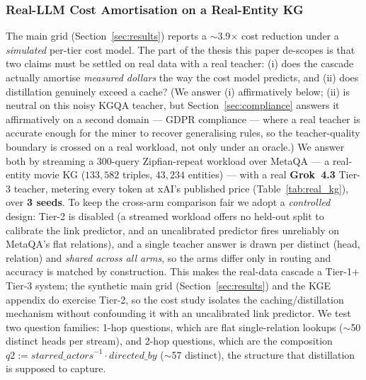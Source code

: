 \documentclass[11pt]{article}
\theoremstyle{plain}
\newcommand{\costFactor}{3.9}
\begin{document}
\subsubsection{Real-LLM Cost Amortisation on a Real-Entity KG}
\label{sec:realcost}
The main grid (Section~\ref{sec:results}) reports a $\sim$\costFactor$\times$
cost reduction under a \emph{simulated} per-tier cost model. The part of the
thesis this paper de-scopes is that two claims must be settled on real data with a
real teacher: (i) does the cascade actually amortise \emph{measured dollars}
the way the cost model predicts, and (ii) does distillation genuinely exceed a
cache? (We answer (i) affirmatively below; (ii) is neutral on this noisy KGQA teacher,
but Section~\ref{sec:compliance} answers it affirmatively on a second domain ---
GDPR compliance --- where a real teacher is accurate enough for the miner to
recover generalising rules, so the teacher-quality boundary is crossed on a real
workload, not only under an oracle.) We answer both by streaming a $300$-query Zipfian-repeat
workload over MetaQA --- a real-entity movie KG ($133{,}582$ triples,
$43{,}234$ entities) --- with a real \textbf{Grok~4.3} Tier-3 teacher, metering
every token at xAI's published price (Table~\ref{tab:real_kg}), over
\textbf{3 seeds}. To keep the cross-arm comparison fair we adopt a
\emph{controlled} design: Tier-2 is disabled (a streamed workload offers no
held-out split to calibrate the link predictor, and an uncalibrated predictor
fires unreliably on MetaQA's flat relations), and a single teacher answer is
drawn per distinct (head,\,relation) and \emph{shared across all arms}, so the
arms differ only in routing and accuracy is matched by construction. This makes
the real-data cascade a Tier-1$+$Tier-3 system; the synthetic main grid
(Section~\ref{sec:results}) and the KGE appendix do exercise Tier-2, so the cost
study isolates the caching/distillation mechanism without confounding it with an
uncalibrated link predictor. We test two
question families: 1-hop questions, which are flat single-relation lookups
($\sim$50 distinct heads per stream), and 2-hop questions, which are the
composition $q2 := \mathit{starred\_actors}^{-1}\cdot\mathit{directed\_by}$
($\sim$57 distinct), the structure that distillation is supposed to capture.

\end{document}
